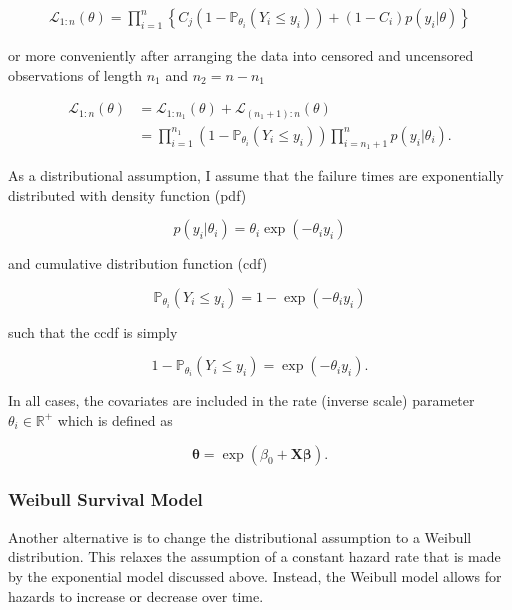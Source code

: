 \documentclass[11pt]{article}
\begin{document}
\begin{align*}
    \mathcal{L}_{1:n}(\theta) = \prod_{i = 1}^n \left\{C_j (1-\mathbb{P}_{\theta_i}(Y_i \leq y_i)) + (1-C_i) p(y_i|\theta)\right\}
\end{align*}

or more conveniently after arranging the data into censored and uncensored observations of length $n_1$ and $n_2 = n - n_1$ 

\begin{align}
    \mathcal{L}_{1:n}(\theta) &= \mathcal{L}_{1:n_1}(\theta) + \mathcal{L}_{(n_1 + 1):n}(\theta) \nonumber \\
    &= \prod_{i = 1}^{n_1} (1-\mathbb{P}_{\theta_i}(Y_i \leq y_i)) \prod_{i = n_1 + 1}^n p(y_i|\theta_i).
    \label{eq:likelihood}
\end{align}

As a distributional assumption, I assume that the failure times are exponentially distributed with density function (pdf)

\begin{equation*}
    p(y_i|\theta_i) = \theta_i \exp(-\theta_i y_i)
\end{equation*}

and cumulative distribution function (cdf) 

\begin{equation*}
    \mathbb{P}_{\theta_i}(Y_i \leq y_i) = 1 - \exp(-\theta_i y_i)
\end{equation*}

such that the ccdf is simply
    
\begin{equation*}
    1 - \mathbb{P}_{\theta_i}(Y_i \leq y_i) = \exp(-\theta_i y_i).
\end{equation*}
    
In all cases, the covariates are included in the rate (inverse scale) parameter $\theta_i \in \mathbb{R}^+$ which is defined as 

\begin{equation*}
    \bm{\theta} = \exp(\beta_0 + \bm{X}\bm{\beta}). 
\end{equation*}

\subsubsection{Weibull Survival Model}
Another alternative is to change the distributional assumption to a Weibull distribution. This relaxes the assumption of a constant hazard rate that is made by the exponential model discussed above. Instead, the Weibull model allows for hazards to increase or decrease over time. 
\end{document}
